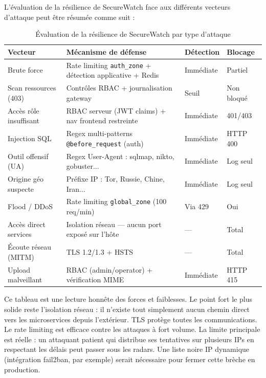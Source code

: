 \documentclass[12pt, a4paper]{report}
\newcommand{\cmark}{\ding{51}}
\newcommand{\xmark}{\ding{55}}
\begin{document}
L'évaluation de la résilience de SecureWatch face aux différents vecteurs d'attaque peut être résumée comme suit :

\begin{table}[H]
  \centering
  \small
  \setlength{\tabcolsep}{5pt}
  \caption{Évaluation de la résilience de SecureWatch par type d'attaque}
  \begin{tabularx}{\textwidth}{@{}p{3.0cm}Xp{2.0cm}p{2.4cm}@{}}
    \toprule
    \textbf{Vecteur} & \textbf{Mécanisme de défense} & \textbf{Détection} & \textbf{Blocage} \\
    \midrule
    Brute force
      & Rate limiting \texttt{auth\_zone} + détection applicative + Redis
      & \cmark{} Immédiate & \cmark{} Partiel \\
    \addlinespace
    Scan ressources (403)
      & Contrôles RBAC + journalisation gateway
      & \cmark{} Seuil & \xmark{} Non bloqué \\
    \addlinespace
    Accès rôle insuffisant
      & RBAC serveur (JWT claims) + nav frontend restreinte
      & \cmark{} Immédiate & \cmark{} 401/403 \\
    \addlinespace
    Injection SQL
      & Regex multi-patterns \texttt{@before\_request} (auth)
      & \cmark{} Immédiate & \cmark{} HTTP 400 \\
    \addlinespace
    Outil offensif (UA)
      & Regex User-Agent : sqlmap, nikto, gobuster...
      & \cmark{} Immédiate & \xmark{} Log seul \\
    \addlinespace
    Origine géo suspecte
      & Préfixe IP : Tor, Russie, Chine, Iran...
      & \cmark{} Immédiate & \xmark{} Log seul \\
    \addlinespace
    Flood / DDoS
      & Rate limiting \texttt{global\_zone} (100 req/min)
      & \cmark{} Via 429 & \cmark{} Oui \\
    \addlinespace
    Accès direct services
      & Isolation réseau — aucun port exposé sur l'hôte
      & --- & \cmark{} Total \\
    \addlinespace
    Écoute réseau (MITM)
      & TLS 1.2/1.3 + HSTS
      & --- & \cmark{} Total \\
    \addlinespace
    Upload malveillant
      & RBAC (admin/operator) + vérification MIME
      & \cmark{} Immédiate & \cmark{} HTTP 415 \\
    \bottomrule
  \end{tabularx}
\end{table}

\medskip
Ce tableau est une lecture honnête des forces et faiblesses. Le point fort le plus solide reste l'isolation réseau : il n'existe tout simplement aucun chemin direct vers les microservices depuis l'extérieur. TLS protège toutes les communications. Le rate limiting est efficace contre les attaques à fort volume. La limite principale est réelle : un attaquant patient qui distribue ses tentatives sur plusieurs IPs en respectant les délais peut passer sous les radars. Une liste noire IP dynamique (intégration fail2ban, par exemple) serait nécessaire pour fermer cette brèche en production.
\end{document}
